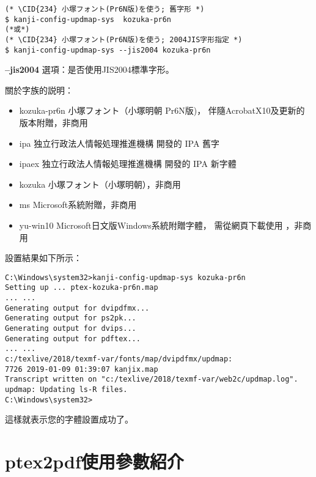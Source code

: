 \documentclass[a4,11pt,uplatex,openleft]{jsarticle}
\begin{document}
\begin{appendix}
\begin{lstlisting}
(* \CID{234} 小塚フォント(Pr6N版)を使う; 舊字形 *)
$ kanji-config-updmap-sys  kozuka-pr6n
(*或*)
(* \CID{234} 小塚フォント(Pr6N版)を使う; 2004JIS字形指定 *)
$ kanji-config-updmap-sys --jis2004 kozuka-pr6n
\end{lstlisting}
\par {\bfseries  --jis2004} 選項：是否使用JIS2004標準字形。
\par 關於字族的説明：
\begin{itemize}
\item kozuka-pr6n  \quad   小塚フォント（小塚明朝 Pr6N版)，
伴隨AcrobatX10及更新的版本附贈，非商用
\item ipa \qquad \qquad \quad 独立行政法人情報処理推進機構
開發的 IPA 舊字
\item ipaex  \quad \qquad  \quad  独立行政法人情報処理推進機構
開發的 IPA 新字體\footnotemark[3]
\item kozuka  \quad \qquad  小塚フォント（小塚明朝），非商用
\item ms  \quad  \qquad \qquad Microsoft系統附贈，非商用
\item yu-win10  \quad \quad  Microsoft日文版Windows系統附贈字體，
需從網頁下載使用
\footnotemark[4]，非商用
\end{itemize}
\par 設置結果如下所示：
\begin{lstlisting}
C:\Windows\system32>kanji-config-updmap-sys kozuka-pr6n
Setting up ... ptex-kozuka-pr6n.map
... ...
Generating output for dvipdfmx...
Generating output for ps2pk...
Generating output for dvips...
Generating output for pdftex...
... ...
c:/texlive/2018/texmf-var/fonts/map/dvipdfmx/updmap:
7726 2019-01-09 01:39:07 kanjix.map
Transcript written on "c:/texlive/2018/texmf-var/web2c/updmap.log".
updmap: Updating ls-R files.
C:\Windows\system32>
\end{lstlisting}
\par 這樣就表示您的字體設置成功了。


\section{ptex2pdf使用參數紹介}\label{ptex2pdf}


\end{appendix}
\end{document}
